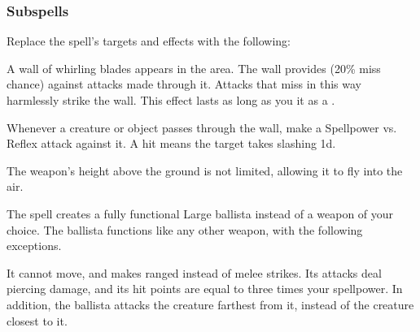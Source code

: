 \subsubsection{Subspells}





Replace the spell's targets and effects with the following:
\begin{spellcontent}

\begin{augmenttargetinginfo}




\end{augmenttargetinginfo}


\begin{augmenteffects}



\spelleffect
A wall of whirling blades appears in the area.
The wall provides  (20\% miss chance) against attacks made through it.
Attacks that miss in this way harmlessly strike the wall.
This effect lasts as long as you  it as a .

Whenever a creature or object passes through the wall, make a Spellpower vs. Reflex attack against it.
A hit means the target takes slashing  \minus1d.






\end{augmenteffects}

\end{spellcontent}






The weapon's height above the ground is not limited, allowing it to fly into the air.







The spell creates a fully functional Large ballista instead of a weapon of your choice.
The ballista functions like any other weapon, with the following exceptions.

It cannot move, and makes ranged  instead of melee strikes.
Its attacks deal piercing damage, and its hit points are equal to three times your spellpower.
In addition, the ballista attacks the creature farthest from it, instead of the creature closest to it.






